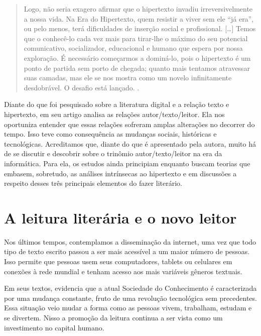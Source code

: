\begin{refsection}
    \begin{quotation}
        Logo, não seria exagero afirmar que o hipertexto invadiu irreversivelmente a nossa vida. Na Era do Hipertexto, quem resistir a viver sem ele “já era”, ou pelo menos, terá dificuldades de inserção social e profissional. [\dots] Temos que o conhecê-lo cada vez mais para tirar-lhe o máximo do seu potencial comunicativo, socializador, educacional e humano que espera por nossa exploração. É necessário começarmos a dominá-lo, pois o hipertexto é um ponto de partida sem porto de chegada; quanto mais tentamos atravessar suas camadas, mas ele se nos mostra como um novelo infinitamente desdobrável. O desafio está lançado. \cite[p.~17]{Xavier2009Era}.
    \end{quotation}

    Diante do que foi pesquisado sobre a literatura digital e a relação texto e hipertexto, \textcite{Correa2006Literatura} em seu artigo analisa as relações autor/texto/leitor. Ela nos oportuniza entender que essas relações sofreram amplas alterações no decorrer do tempo. Isso teve como consequência as mudanças sociais, históricas e tecnológicas. Acreditamos que, diante do que é apresentado pela autora, muito há de se discutir e descobrir sobre o trinômio autor/texto/leitor na era da informática.  Para ela, os estudos ainda principiam enquanto buscam teorias que embasem, sobretudo, as análises intrínsecas ao hipertexto e em discussões a respeito desses três principais elementos do fazer literário.

    \section{A leitura literária e o novo leitor}

    Nos últimos tempos, contemplamos a disseminação da internet, uma vez que todo tipo de texto escrito passou a ser mais acessível a um maior número de pessoas. Isso permite que pessoas usem seus computadores, tablets ou celulares em conexões à rede mundial e tenham acesso aos mais variáveis gêneros textuais.  

    Em seus textos, \textcite{Ramos2015Fazer} evidencia que a atual Sociedade do Conhecimento é caracterizada por uma mudança constante, fruto de uma revolução tecnológica sem precedentes. Essa situação veio mudar a forma como as pessoas vivem, trabalham, estudam e se divertem. Nisso a promoção da leitura continua a ser vista como um investimento no capital humano.  


\end{refsection}
